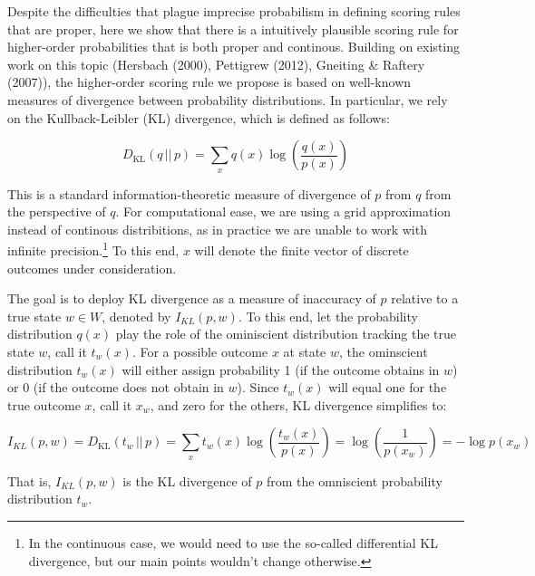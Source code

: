\documentclass[
  letterpaper,
  DIV=11,
  numbers=noendperiod]{scrartcl}
\begin{document}
Despite the difficulties that plague imprecise probabilism in defining
scoring rules that are proper, here we show that there is a intuitively
plausible scoring rule for higher-order probabilities that is both
proper and continous. Building on existing work on this topic (Hersbach
(2000), Pettigrew (2012), Gneiting \& Raftery (2007)), the higher-order
scoring rule we propose is based on well-known measures of divergence
between probability distributions. In particular, we rely on the
Kullback-Leibler (KL) divergence, which is defined as follows:

\[ D_{\text{KL}}(q \,||\, p) = \sum_{x} q(x) \log\left(\frac{q(x)}{p(x)}\right) \]

\noindent This is a standard information-theoretic measure of divergence
of \(p\) from \(q\) from the perspective of \(q\). For computational
ease, we are using a grid approximation instead of continous
distribitions, as in practice we are unable to work with infinite
precision.\footnote{In the continuous case, we would need to use the so-called differential KL divergence, but our main points wouldn't change otherwise.}
To this end, \(x\) will denote the finite vector of discrete outcomes
under consideration.

The goal is to deploy KL divergence as a measure of inaccuracy of \(p\)
relative to a true state \(w\in W\), denoted by \(I_{KL}(p, w)\). To
this end, let the probability distribution \(q(x)\) play the role of the
ominiscient distribution tracking the true state \(w\), call it
\(t_w(x)\). For a possible outcome \(x\) at state \(w\), the ominscient
distribution \(t_w(x)\) will either assign probability 1 (if the outcome
obtains in \(w\)) or 0 (if the outcome does not obtain in \(w\)). Since
\(t_w(x)\) will equal one for the true outcome \(x\), call it \(x_w\),
and zero for the others, KL divergence simplifies to:

\[ I_{KL}(p, w) = D_{\text{KL}}(t_w \,||\, p) = \sum_{x} t_w(x) \log\left(\frac{t_w(x)}{p(x)}\right) = \log\left(\frac{1}{p(x_w)}\right)= -\log p(x_w) \]

\noindent That is, \(I_{KL}(p, w)\) is the KL divergence of \(p\) from
the omniscient probability distribution \(t_w\).
\end{document}
